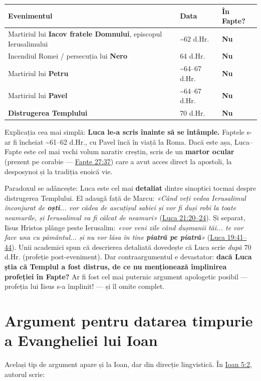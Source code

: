 \documentclass[12pt,a4paper,twoside,openany]{book}
\begin{document}
\begin{center}
\small
\begin{tabular}{L{11.0cm}L{2.2cm}L{1.7cm}}
\toprule
{}
\textbf{Evenimentul} & \textbf{Data} & \textbf{În Fapte?} \\
\midrule
Martiriul lui \textbf{Iacov fratele Domnului}, episcopul Ierusalimului & \textasciitilde{}62 d.Hr. & \textbf{Nu} \\
Incendiul Romei / persecuția lui \textbf{Nero} & 64 d.Hr. & \textbf{Nu} \\
Martiriul lui \textbf{Petru} & \textasciitilde{}64–67 d.Hr. & \textbf{Nu} \\
Martiriul lui \textbf{Pavel} & \textasciitilde{}64–67 d.Hr. & \textbf{Nu} \\
\textbf{Distrugerea Templului} & 70 d.Hr. & \textbf{Nu} \\
\bottomrule
\end{tabular}
\end{center}
\normalsize
Explicația cea mai simplă: \textbf{Luca le-a scris înainte să se întâmple.} Faptele s-ar fi încheiat \textasciitilde{}61–62 d.Hr., cu Pavel încă în viață la Roma. Dacă este așa, Luca–Fapte este cel mai vechi volum narativ creștin, scris de un \textbf{martor ocular} (prezent pe corabie — \href{https://bibliaortodoxa.ro/carte.php?id=26\&cap=27\#37}{Fapte 27:37}) care a avut acces direct la apostoli, la desposynoi și la tradiția enoică vie.

Paradoxul se adâncește: Luca este cel mai \textbf{detaliat} dintre sinoptici tocmai despre distrugerea Templului. El adaugă față de Marcu: \textit{«Când veți vedea Ierusalimul înconjurat de \textbf{oști}... vor cădea de ascuțișul sabiei și vor fi duși robi la toate neamurile, și Ierusalimul va fi călcat de neamuri»} (\href{https://bibliaortodoxa.ro/carte.php?id=48\&cap=21\#20}{Luca 21:20–24}). Și separat, Iisus Hristos plânge peste Ierusalim: \textit{«vor veni zile când dușmanii tăi... te vor face una cu pământul... și nu vor lăsa în tine \textbf{piatră pe piatră}»} (\href{https://bibliaortodoxa.ro/carte.php?id=48\&cap=19\#41}{Luca 19:41–44}). Unii academici spun că descrierea detaliată dovedește că Luca scrie \textit{după} 70 d.Hr. (profeție post-eveniment). Dar contraargumentul e devastator: \textbf{dacă Luca știa că Templul a fost distrus, de ce nu menționează împlinirea profeției în Fapte?} Ar fi fost cel mai puternic argument apologetic posibil — profeția lui Iisus s-a împlinit! — și îl omite complet.


\section{Argument pentru datarea timpurie a Evangheliei lui Ioan}
Același tip de argument apare și la Ioan, dar din direcție lingvistică. În \href{https://bibliaortodoxa.ro/carte.php?id=35\&cap=5\#2}{Ioan 5:2}, autorul scrie:
\end{document}
